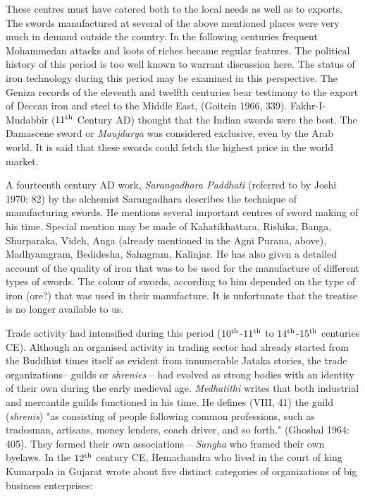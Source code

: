 These centres must have catered both to the local needs as well as to exports. The swords manufactured at several of the above mentioned places were very much in demand outside the country. In the following centuries frequent Mohammedan attacks and loots of riches became regular features. The political history of this period is too well known to warrant discussion here. The status of iron technology during this period may be examined in this perspective. The Geniza records of the eleventh and twelfth centuries bear testimony to the export of Deccan iron and steel to the Middle East, (Goitein 1966, 339). Fakhr-I-Mudabbir ($11^{\rm th}$ Century AD) thought that the Indian swords were the best. The Damascene sword or {\it Maujdarya} was considered exclusive, even by the Arab world. It is said that these swords could fetch the highest price in the world market. 

A fourteenth century AD work, {\it Sarangadhara Paddhati} (referred to by Joshi 1970: 82) by the alchemist Sarangadhara describes the technique of manufacturing swords. He mentions several important centres of sword making of his time. Special mention may be made of Kahatikhattara, Rishika, Banga, Shurparaka, Videh, Anga (already mentioned in the Agni Purana, above), Madhyamgram, Bedidesha, Sahagram, Kalinjar. He has also given a detailed account of the quality of iron that was to be used for the manufacture of different types of swords. The colour of swords, according to him depended on the type of iron (ore?) that was used in their manufacture. It is unfortunate that the treatise is no longer available to us. 

Trade activity had intensified during this period ($10^{\rm th}$-$11^{\rm th}$ to $14^{\rm th}$-$15^{\rm th}$ centuries CE). Although an organised activity in trading sector had already started from the Buddhist times itself as evident from innumerable Jataka stories, the trade organizations– guilds or {\it shrenies} – had evolved as strong bodies with an identity of their own during the early medieval age. {\it Medhatithi} writes that both industrial and mercantile guilds functioned in his time. He defines (VIII, 41) the guild ({\it shrenis}) "as consisting of people following common professions, such as tradesman, artisans, money lenders, coach driver, and so forth." (Ghoshal 1964: 405). They formed their own associations – {\it Sangha} who framed their own byelaws. In the $12^{\rm th}$ century CE, Hemachandra who lived in the court of king Kumarpala in Gujarat wrote about five distinct categories of organizations of big business enterprises:

